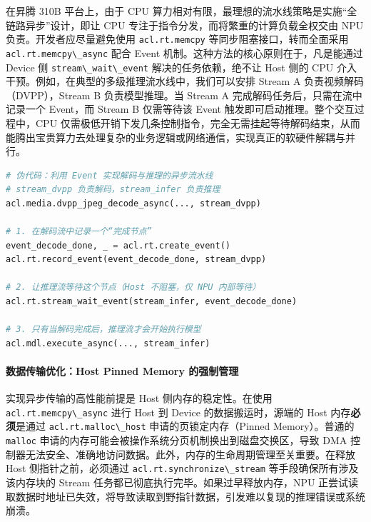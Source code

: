 在昇腾 310B 平台上，由于 CPU
算力相对有限，最理想的流水线策略是实施``全链路异步''设计，即让 CPU
专注于指令分发，而将繁重的计算负载全权交由 NPU
负责。开发者应尽量避免使用 \passthrough{\lstinline!acl.rt.memcpy!}
等同步阻塞接口，转而全面采用
\passthrough{\lstinline!acl.rt.memcpy\_async!} 配合 Event
机制。这种方法的核心原则在于，凡是能通过 Device 侧
\passthrough{\lstinline!stream\_wait\_event!} 解决的任务依赖，绝不让
Host 侧的 CPU 介入干预。例如，在典型的多级推理流水线中，我们可以安排
Stream A 负责视频解码（DVPP），Stream B 负责模型推理。当 Stream A
完成解码任务后，只需在流中记录一个 Event，而 Stream B 仅需等待该 Event
触发即可启动推理。整个交互过程中，CPU
仅需极低开销下发几条控制指令，完全无需挂起等待解码结束，从而能腾出宝贵算力去处理复杂的业务逻辑或网络通信，实现真正的软硬件解耦与并行。

\begin{lstlisting}[language=Python]
# 伪代码：利用 Event 实现解码与推理的异步流水线
# stream_dvpp 负责解码，stream_infer 负责推理
acl.media.dvpp_jpeg_decode_async(..., stream_dvpp)

# 1. 在解码流中记录一个“完成节点”
event_decode_done, _ = acl.rt.create_event()
acl.rt.record_event(event_decode_done, stream_dvpp)

# 2. 让推理流等待这个节点（Host 不阻塞，仅 NPU 内部等待）
acl.rt.stream_wait_event(stream_infer, event_decode_done)

# 3. 只有当解码完成后，推理流才会开始执行模型
acl.mdl.execute_async(..., stream_infer)
\end{lstlisting}

\paragraph{数据传输优化：Host Pinned Memory
的强制管理}\label{src-book-chapter4-h16}

实现异步传输的高性能前提是 Host 侧内存的稳定性。在使用
\passthrough{\lstinline!acl.rt.memcpy\_async!} 进行 Host 到 Device
的数据搬运时，源端的 Host 内存\textbf{必须}是通过
\passthrough{\lstinline!acl.rt.malloc\_host!} 申请的页锁定内存（Pinned
Memory）。普通的 \passthrough{\lstinline!malloc!}
申请的内存可能会被操作系统分页机制换出到磁盘交换区，导致 DMA
控制器无法安全、准确地访问数据。此外，内存的生命周期管理至关重要。在释放
Host 侧指针之前，必须通过
\passthrough{\lstinline!acl.rt.synchronize\_stream!}
等手段确保所有涉及该内存块的 Stream
任务都已彻底执行完毕。如果过早释放内存，NPU
正尝试读取数据时地址已失效，将导致读取到野指针数据，引发难以复现的推理错误或系统崩溃。

